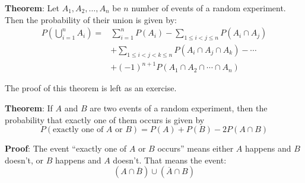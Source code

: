 \documentclass[twoside]{book}
\begin{document}
\begin{textbox}
\textbf{Theorem}: Let \( A_1, A_2, \ldots, A_n \) be $n$ number of events of a random experiment. Then the probability of their union is given by:
\begin{align*}
P\left( \bigcup_{i=1}^n A_i \right)
= &\sum_{i=1}^{n} P(A_i)
- \sum_{1 \le i < j \le n} P(A_i \cap A_j) \\
&+ \sum_{1 \le i < j < k \le n} P(A_i \cap A_j \cap A_k)
- \cdots \\
&+ (-1)^{n+1} P(A_1 \cap A_2 \cap \cdots \cap A_n)
\end{align*}
\end{textbox}
The proof of this theorem is left as an exercise.

\begin{textbox}
    \textbf{Theorem}: If $A$ and $B$ are two events of a random experiment, then the probability that exactly one of them occurs is given by
    $$P(\text{exactly one of } A \text{ or } B) = P(A) + P(B) - 2P(A \cap B)$$
\end{textbox}
\textbf{Proof}: The event ``exactly one of $A$ or $B$ occurs'' means either $A$ happens and $B$ doesn't, or $B$  happens and $A$ doesn't. That means the event:
\[
(A \cap \overline{B}) \cup (\overline{A} \cap B)
\]




\begin{center}
\end{center}
\end{document}
